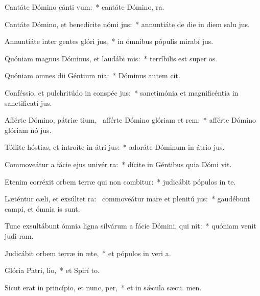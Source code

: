 \item Cantáte Dómino cánti vum:~* cantáte Dómino,  ra.
\item Cantáte Dómino, et benedícite nómi jus:~* annuntiáte de die in diem salu jus.
\item Annuntiáte inter gentes glóri jus,~* in ómnibus pópulis mirabí jus.
\item Quóniam magnus Dóminus, et laudábi mis:~* terríbilis est super  os.
\item Quóniam omnes dii Géntium nia:~* Dóminus autem  cit.
\item Conféssio, et pulchritúdo in conspéc jus:~* sanctimónia et magnificéntia in sanctificati jus.
\item Afférte Dómino, pátriæ tium,~\pscross{} afférte Dómino glóriam et rem:~* afférte Dómino glóriam nó jus.
\item Tóllite hóstias, et introíte in átri jus:~* adoráte Dóminum in átrio  jus.
\item Commoveátur a fácie ejus univér ra:~* dícite in Géntibus quia Dómi vit.
\item Etenim corréxit orbem terræ qui non combitur:~* judicábit pópulos in te.
\item Læténtur cæli, et exsúltet ra:~\pscross{} commoveátur mare et plenitú jus:~* gaudébunt campi, et ómnia   is sunt.
\item Tunc exsultábunt ómnia ligna silvárum a fácie Dómini, qui nit:~* quóniam venit judi ram.
\item Judicábit orbem terræ in æte,~* et pópulos in veri a.
\item Glória Patri,  lio,~* et Spirí to.
\item Sicut erat in princípio, et nunc,  per,~* et in sǽcula sæcu. men.
